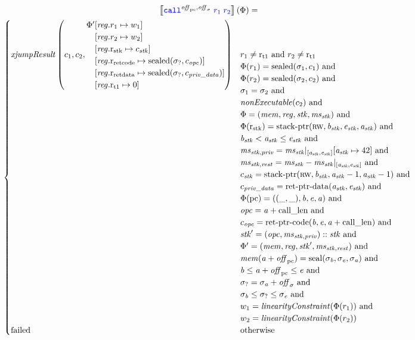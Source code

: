 \documentclass[a4paper]{article}
\begin{document}
\begin{multline*}
  \sem{\scall{\offpc,\offsigma}{\src{r_1}}{\src{r_2}}}(\Phi) = \\
  \begin{cases}
    \mathit{xjumpResult}\left(c_1,c_2, 
     \arraycolsep=0pt
    \array[]{rl}
      \Phi'&\updReg{r_1}{w_1} \\
      &\updReg{r_2}{w_2} \\
      &\updReg{\rstk}{c_\stk}\\
      &\updReg{\rretc}{\sealed{\sigma_?,c_\opc}}\\
      &\updReg{\rretd}{\sealed{\sigma_?,c_\var{priv\_data}}}\\
      &\updReg{\rtmp{1}}{0}
      \endarray
     \right)
    & \arraycolsep=0pt
    \begin{array}[t]{l}
      r_1 \neq \rtmp{1} \tand r_2 \neq \rtmp{1} \\
      \Phi(r_1) = \sealed{\sigma_1,c_1} \tand \\
      \Phi(r_2) = \sealed{\sigma_2,c_2} \tand \\
      \sigma_1 = \sigma_2 \tand \\
      \nonExec{c_2} \tand\\
      \Phi = (\mem,\reg,\stk,\ms_\stk) \tand\\
      \Phi(\rstk) = \stkptr{\rw,\baddr_\stk,\eaddr_\stk,\aaddr_\stk} \tand \\
      \baddr_\stk < \aaddr_\stk \leq \eaddr_\stk \tand \\
      \ms_{\stk,\priv} = \ms_\stk |_{[\aaddr_\stk,\eaddr_\stk]}\update{\aaddr_\stk}{42} \tand\\
      \ms_{\stk,\var{rest}} = \ms_\stk - \ms_\stk |_{[\aaddr_\stk,\eaddr_\stk]} \tand \\
      c_\stk = \stkptr{\rw,\baddr_\stk,\aaddr_\stk-1,\aaddr_\stk-1} \tand \\
      c_\var{priv\_data} = \retptrd(\aaddr_\stk,\eaddr_\stk) \tand \\
      \Phi(\pcreg) = ((\_,\_),\baddr,\eaddr,\aaddr) \tand \\
      \opc = \aaddr + \calllen \tand \\
      c_\opc = \retptrc(\baddr,\eaddr,\aaddr+\calllen) \tand \\
      \stk' = (\opc,\ms_{\stk,\priv}) :: \stk \tand\\
      \Phi' = (\mem,\reg,\stk',\ms_{\stk,\var{rest}})\tand\\
      \mem(\aaddr+\offpc) = \seal{\sigma_\baddr,\sigma_\eaddr,\sigma_\aaddr}\tand\\
      \baddr \leq  \aaddr+\offpc \leq \eaddr \tand \\
      \sigma_? = \sigma_\aaddr + \offsigma \tand\\
      \sigma_\baddr \leq \sigma_? \leq \sigma_\eaddr \tand\\
      w_1 = \linCons{\Phi(r_1)} \tand \\
      w_2 = \linCons{\Phi(r_2)}
    \end{array}\\
    \failed & \totherwise
  \end{cases}
\end{multline*}
\end{document}
